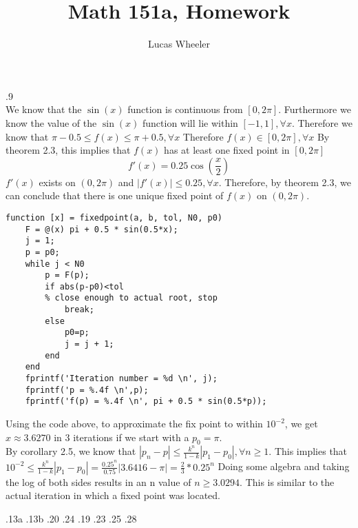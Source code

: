 \documentclass[11pt]{exam}
\title{Math 151a, Homework \hw}
\author{Lucas Wheeler}
\date{}
\theoremstyle{plain}
\theoremstyle{definition}\newtheorem{definition}[theorem]{Definition}
\theoremstyle{definition}\newtheorem*{definition*}{Definition}
\begin{document}
\maketitle
\begin{questions}
.9 \\
We know that the $\sin (x)$ function is continuous from $[0,2\pi]$. Furthermore we know the value of the $\sin (x)$ function will lie within $[-1,1], \forall x$. Therefore we know that $ \pi - 0.5 \leq f(x)  \leq \pi + 0.5, \forall x$ Therefore $f(x) \in [0,2\pi], \forall x$ By theorem 2.3, this implies that $f(x)$ has at least one fixed point in $[0,2\pi]$
\[f'(x) = 0.25 \cos (\frac{x}{2}) \]
$f'(x)$ exists on $(0,2\pi)$ and $|f'(x)| \leq 0.25, \forall x$. Therefore, by theorem 2.3, we can conclude that there is one unique fixed point of $f(x)$ on $(0,2\pi)$. \\
\begin{lstlisting}[style=Matlab-editor]
    function [x] = fixedpoint(a, b, tol, N0, p0)
    F = @(x) pi + 0.5 * sin(0.5*x);
    j = 1;
    p = p0;
    while j < N0
        p = F(p);
        if abs(p-p0)<tol
        % close enough to actual root, stop
            break;
        else
            p0=p;
            j = j + 1;
        end
    end
    fprintf('Iteration number = %d \n', j);
    fprintf('p = %.4f \n',p);
    fprintf('f(p) = %.4f \n', pi + 0.5 * sin(0.5*p));
\end{lstlisting}
Using the code above, to approximate the fix point to within $10^{-2}$, we get $x \approx 3.6270$ in 3 iterations if we start with a $p_0 = \pi$.\\
By corollary 2.5, we know that $|p_n - p| \leq \frac{k^n}{1-k} |p_1 - p_0|, \forall n \geq 1$. This implies that $10^{-2} \leq \frac{k^n}{1-k} |p_1 - p_0| = \frac{0.25^n}{0.75} |3.6416 - \pi| = \frac{2}{3} * 0.25^n$ 
Doing some algebra and taking the log of both sides results in an n value of $n \geq 3.0294$. This is similar to the actual iteration in which a fixed point was located. 

.13a
.13b 
.20 
.24 
.19 
.23
.25
.28

\begin{parts}
\part 
\end{parts}
\end{questions}
\end{document}
